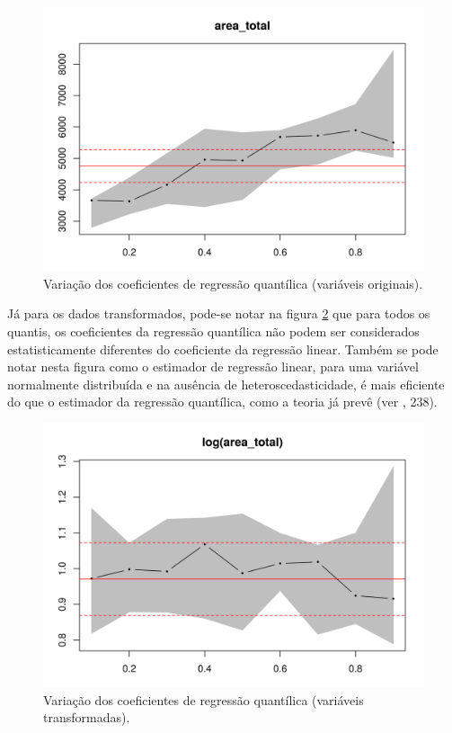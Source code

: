 \documentclass[a4paper, 12pt]{article}
\begin{document}
\begin{figure}[H]

{\centering \includegraphics[width=0.7\linewidth]{images/coef1-1} 

}

\caption{Variação dos coeficientes de regressão quantílica (variáveis originais).}\label{fig:coef1}
\end{figure}

Já para os dados transformados, pode-se notar na figura \ref{fig:coef2}
que para todos os quantis, os coeficientes da regressão quantílica não
podem ser considerados estatisticamente diferentes do coeficiente da
regressão linear. Também se pode notar nesta figura como o estimador de
regressão linear, para uma variável normalmente distribuída e na
ausência de heteroscedasticidade, é mais eficiente do que o estimador da
regressão quantílica, como a teoria já prevê (ver
\textcite{matloff2017}, 238).

\begin{figure}[H]

{\centering \includegraphics[width=0.7\linewidth]{images/coef2-1} 

}

\caption{Variação dos coeficientes de regressão quantílica (variáveis transformadas).}\label{fig:coef2}
\end{figure}
\end{document}
